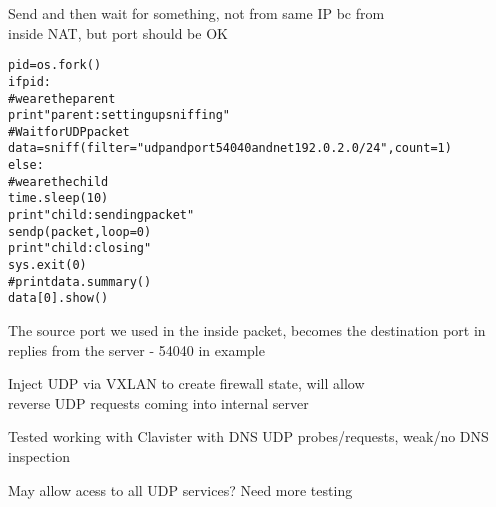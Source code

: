 \documentclass[Screen16to9,17pt,footrule]{foils}
\begin{document}
Send and then wait for something, not from same IP bc from\\
inside NAT, but port should be OK
\begin{alltt}\footnotesize
pid = os.fork()
if pid:
    # we are the parent
    print "parent: setting up sniffing"
    # Wait for UDP packet
    data = sniff(filter="udp and port 54040 and net 192.0.2.0/24", count=1)
else:
    # we are the child
    time.sleep(10)
    print "child: sending packet"
    sendp(packet,loop=0)
    print "child: closing"
    sys.exit(0)
#print data.summary()
data[0].show()
\end{alltt}

The source port we used in the inside packet, becomes the destination port in replies from the server - 54040 in example



Inject UDP via VXLAN to create firewall state, will allow\\
reverse UDP requests coming into internal server


{\small Tested working with Clavister with DNS UDP probes/requests, weak/no DNS inspection
\vskip 5mm
\centerline{May allow acess to all UDP services? Need more testing}}
\end{document}
